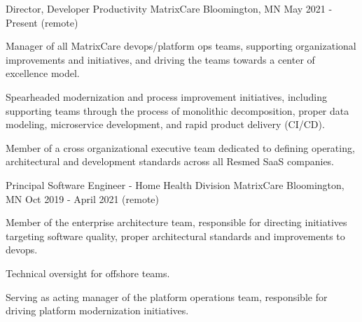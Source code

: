 \begin{cventries}

  \cventry
    {Director, Developer Productivity} %
    {MatrixCare} %
    {Bloomington, MN} %
    {May 2021 - Present (remote)} %
    {
      \begin{cvitems} %
        \item {Manager of all MatrixCare devops/platform ops teams, supporting organizational improvements and initiatives, and driving the teams towards a center of excellence model.}
        \item {Spearheaded modernization and process improvement initiatives, including supporting teams through the process of monolithic decomposition, proper data modeling, microservice development, and rapid product delivery (CI/CD).}
        \item {Member of a cross organizational executive team dedicated to defining operating, architectural and development standards across all Resmed SaaS companies.}
      \end{cvitems}
    }
    

  \cventry
    {Principal Software Engineer - Home Health Division} %
    {MatrixCare} %
    {Bloomington, MN} %
    {Oct 2019 - April 2021 (remote)} %
    {
      \begin{cvitems} %
        \item {Member of the enterprise architecture team, responsible for directing initiatives targeting software quality, proper architectural standards and improvements to devops.}
        \item {Technical oversight for offshore teams.}
        \item {Serving as acting manager of the platform operations team, responsible for driving platform modernization initiatives.}
      \end{cvitems}
    }
    

\end{cventries}
